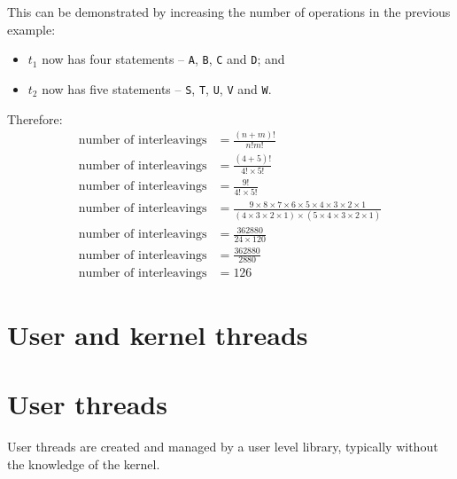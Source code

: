 \documentclass[a4paper]{systems-software}
\begin{document}
\newpage

This can be demonstrated by increasing the number of operations in the previous example:
\begin{itemize}
	\item $t_{1}$ now has four statements -- \texttt{A}, \texttt{B}, \texttt{C} and \texttt{D}; and
	\item $t_{2}$ now has five statements -- \texttt{S}, \texttt{T}, \texttt{U}, \texttt{V} and \texttt{W}.
\end{itemize}

Therefore:
\begin{equation*}
	\begin{aligned}
		\text{number of interleavings} & = \frac{(n + m)!}{n!m!} \\
		\text{number of interleavings} & = \frac{(4 + 5)!}{4!\times5!} \\
		\text{number of interleavings} & = \frac{9!}{4!\times5!} \\
		\text{number of interleavings} & = \frac{9\times8\times7\times6\times5\times4\times3\times2\times1}{(4\times3\times2\times1)\times(5\times4\times3\times2\times1)} \\
		\text{number of interleavings} & = \frac{362880}{24\times120} \\
		\text{number of interleavings} & = \frac{362880}{2880} \\
		\text{number of interleavings} & = 126
	\end{aligned}
\end{equation*}


\newpage

\section{User and kernel threads}

\section*{User threads}

User threads are created and managed by a user level library, typically without the knowledge of the kernel.
\end{document}
